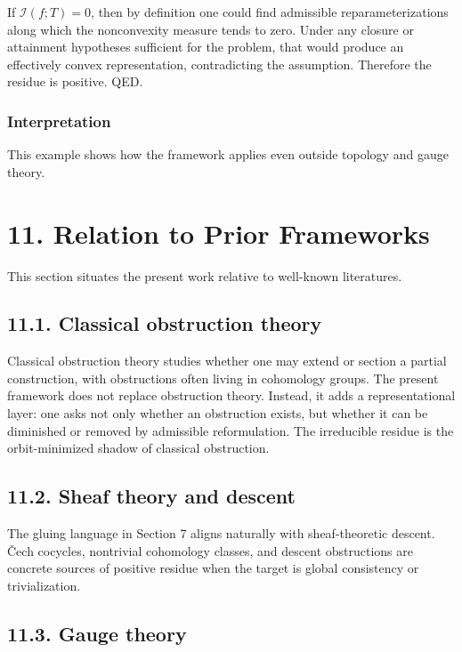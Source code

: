 \documentclass[
]{article}
\begin{document}
If \(\mathcal{I}(f;T) = 0\), then by definition one could find
admissible reparameterizations along which the nonconvexity measure
tends to zero. Under any closure or attainment hypotheses sufficient for
the problem, that would produce an effectively convex representation,
contradicting the assumption. Therefore the residue is positive. QED.

\subsubsection{Interpretation}\label{interpretation-6}

This example shows how the framework applies even outside topology and
gauge theory.

\section{11. Relation to Prior
Frameworks}\label{relation-to-prior-frameworks}

This section situates the present work relative to well-known
literatures.

\subsection{11.1. Classical obstruction
theory}\label{classical-obstruction-theory}

Classical obstruction theory studies whether one may extend or section a
partial construction, with obstructions often living in cohomology
groups. The present framework does not replace obstruction theory.
Instead, it adds a representational layer: one asks not only whether an
obstruction exists, but whether it can be diminished or removed by
admissible reformulation. The irreducible residue is the orbit-minimized
shadow of classical obstruction.

\subsection{11.2. Sheaf theory and
descent}\label{sheaf-theory-and-descent}

The gluing language in Section 7 aligns naturally with sheaf-theoretic
descent. Čech cocycles, nontrivial cohomology classes, and descent
obstructions are concrete sources of positive residue when the target is
global consistency or trivialization.

\subsection{11.3. Gauge theory}\label{gauge-theory}
\end{document}
